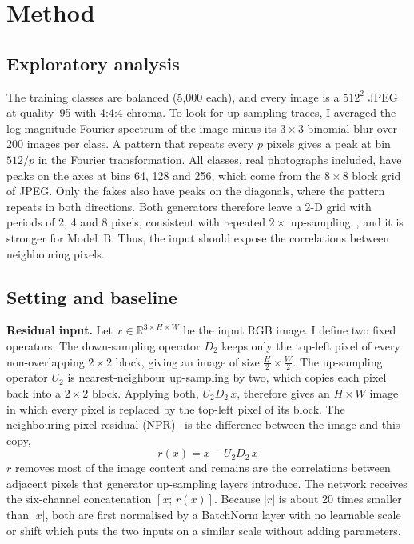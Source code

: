 \section{Method}
\label{sec:method}



\subsection{Exploratory analysis}
\label{sec:eda}
The training classes are balanced (5,000 each), and every image is a $512^2$ JPEG at quality~95 with 4:4:4 chroma. To look for up-sampling traces, I averaged the log-magnitude Fourier spectrum of the image minus its $3\times3$ binomial blur over 200 images per class. A pattern that repeats every $p$ pixels gives a peak at bin $512/p$ in the Fourier transformation. All classes, real photographs included, have peaks on the axes at bins 64, 128 and 256, which come from the $8\times8$ block grid of JPEG. Only the fakes also have peaks on the diagonals, where the pattern repeats in both directions. Both generators therefore leave a 2-D grid with periods of 2, 4 and 8 pixels, consistent with repeated $2\times$ up-sampling~\cite{odena2016checkerboard,zhang2019spectrum}, and it is stronger for Model~B. Thus, the input should expose the correlations between neighbouring pixels.

\subsection{Setting and baseline}
\label{sec:baseline}

\noindent\textbf{Residual input.} Let $x \in \mathbb{R}^{3\times H\times W}$ be the input RGB image. I define two fixed operators. The down-sampling operator $D_2$ keeps only the top-left pixel of every non-overlapping $2\times2$ block, giving an image of size $\frac{H}{2}\times\frac{W}{2}$. The up-sampling operator $U_2$ is nearest-neighbour up-sampling by two, which copies each pixel back into a $2\times2$ block. Applying both, $U_2 D_2\, x$, therefore gives an $H\times W$ image in which every pixel is replaced by the top-left pixel of its block. The neighbouring-pixel residual (NPR)~\cite{tan2024npr} is the difference between the image and this copy,
\begin{equation}
  r(x) = x - U_2 D_2\, x
  \label{eq:npr}
\end{equation}
  $r$ removes most of the image content and remains are the correlations between adjacent pixels that generator up-sampling layers introduce. The network receives the six-channel concatenation $[x;\,r(x)]$. Because $|r|$ is about 20 times smaller than $|x|$, both are first normalised by a BatchNorm layer with no learnable scale or shift which puts the two inputs on a similar scale without adding parameters.


